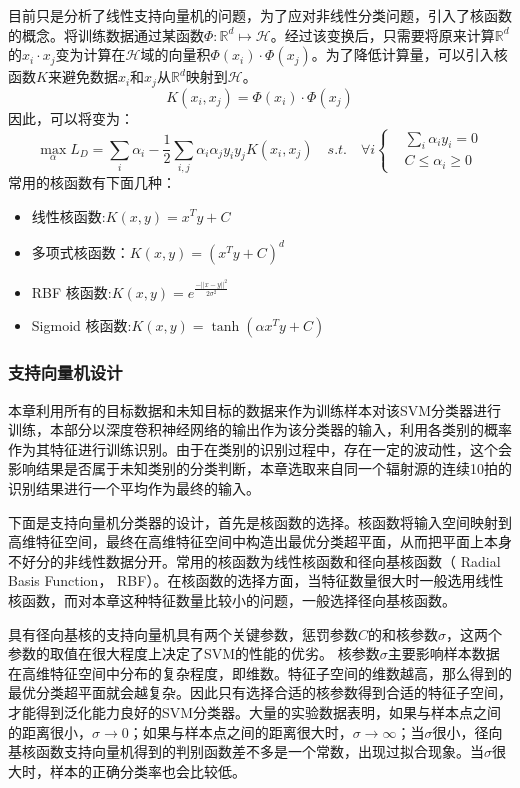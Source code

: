 目前只是分析了线性支持向量机的问题，为了应对非线性分类问题，引入了核函数的概念。将训练数据通过某函数$\Phi:\mathbb{R}^d\mapsto\mathcal{H}$。经过该变换后，只需要将原来计算$\mathbb{R}^d$的$x_i\cdot x_j$变为计算在$\mathcal{H}$域的向量积$\Phi(x_i)\cdot\Phi(x_j)$。为了降低计算量，可以引入核函数$K$来避免数据$x_i$和$x_j$从$\mathbb{R}^d$映射到$\mathcal{H}$。
\begin{equation}
	K(x_i,x_j)=\Phi(x_i)\cdot\Phi(x_j)
\end{equation}
因此，可以将变为：
\begin{equation}
	\max \limits_{\alpha} L_D=\sum_i{\alpha_i}-\frac{1}{2}\sum_{i,j}\alpha_i\alpha_jy_iy_j K(x_i,x_j)\quad s.t. \quad \forall i
	\left\{
		\begin{aligned}
	   &\sum_i{\alpha_iy_i}=0  \\
	   &C \leq \alpha_i \geq 0
	   \end{aligned}
		\right.
\end{equation}
常用的核函数有下面几种：
\begin{itemize}
	\item 线性核函数:$K(x,y)=x^Ty+C$
	\item 多项式核函数：$K(x,y)=(x^Ty+C)^d$
	\item RBF 核函数:$K(x,y)=e^{\frac{-||x-y||^2}{2\sigma^2}}$
	\item Sigmoid 核函数:$K(x,y)=\tanh(\alpha x^Ty+C)$
\end{itemize}
\subsubsection{支持向量机设计}
本章利用所有的目标数据和未知目标的数据来作为训练样本对该SVM分类器进行训练，本部分以深度卷积神经网络的输出作为该分类器的输入，利用各类别的概率作为其特征进行训练识别。由于在类别的识别过程中，存在一定的波动性，这个会影响结果是否属于未知类别的分类判断，本章选取来自同一个辐射源的连续10拍的识别结果进行一个平均作为最终的输入。

下面是支持向量机分类器的设计，首先是核函数的选择。核函数将输入空间映射到高维特征空间，最终在高维特征空间中构造出最优分类超平面，从而把平面上本身不好分的非线性数据分开。常用的核函数为线性核函数和径向基核函数（ Radial Basis Function， RBF）。在核函数的选择方面，当特征数量很大时一般选用线性核函数，而对本章这种特征数量比较小的问题，一般选择径向基核函数。

具有径向基核的支持向量机具有两个关键参数，惩罚参数$C$的和核参数$\sigma$，这两个参数的取值在很大程度上决定了SVM的性能的优劣。
核参数$\sigma$主要影响样本数据在高维特征空间中分布的复杂程度，即维数。特征子空间的维数越高，那么得到的最优分类超平面就会越复杂。因此只有选择合适的核参数得到合适的特征子空间，才能得到泛化能力良好的SVM分类器。大量的实验数据表明，如果与样本点之间的距离很小，$\sigma \rightarrow 0$；如果与样本点之间的距离很大时，$\sigma \rightarrow \infty$；当$\sigma$很小，径向基核函数支持向量机得到的判别函数差不多是一个常数，出现过拟合现象。当$\sigma$很大时，样本的正确分类率也会比较低。

